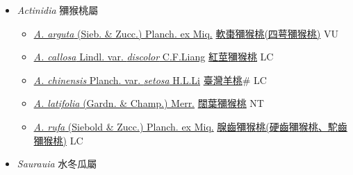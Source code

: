 
  \begin{itemize}
 \item[] \textit{Actinidia} 獼猴桃屬
                    
  \begin{itemize}
        \item[] \href{http://www.theplantlist.org/tpl1.1/search?q=Actinidia+arguta}{\textit{A. arguta} (Sieb. \& Zucc.) Planch. ex Miq.}     \href{\detokenize{http://taibnet.sinica.edu.tw/chi/taibnet_species_list.php?T2=軟棗獼猴桃&T2_new_value=true&fr=y}}{軟棗獼猴桃(四萼獼猴桃)}   VU
        \item[] \href{http://www.theplantlist.org/tpl1.1/search?q=Actinidia+callosa+var.+discolor}{\textit{A. callosa} Lindl. var. \textit{discolor} C.F.Liang}     \href{\detokenize{http://taibnet.sinica.edu.tw/chi/taibnet_species_list.php?T2=紅莖獼猴桃&T2_new_value=true&fr=y}}{紅莖獼猴桃} LC
        \item[] \href{http://www.theplantlist.org/tpl1.1/search?q=Actinidia+chinensis+var.+setosa}{\textit{A. chinensis} Planch. var. \textit{setosa} H.L.Li}   \href{\detokenize{http://taibnet.sinica.edu.tw/chi/taibnet_species_list.php?T2=臺灣羊桃&T2_new_value=true&fr=y}}{臺灣羊桃}\# LC
        \item[] \href{http://www.theplantlist.org/tpl1.1/search?q=Actinidia+latifolia}{\textit{A. latifolia} (Gardn. \& Champ.) Merr.}   \href{\detokenize{http://taibnet.sinica.edu.tw/chi/taibnet_species_list.php?T2=闊葉獼猴桃&T2_new_value=true&fr=y}}{闊葉獼猴桃} NT
        \item[] \href{http://www.theplantlist.org/tpl1.1/search?q=Actinidia+rufa}{\textit{A. rufa} (Siebold \& Zucc.) Planch. ex Miq.}        \href{\detokenize{http://taibnet.sinica.edu.tw/chi/taibnet_species_list.php?T2=腺齒獼猴桃&T2_new_value=true&fr=y}}{腺齒獼猴桃(硬齒獼猴桃、駝齒獼猴桃)}    LC
  \end{itemize}
 \item[] \textit{Saurauia} 水冬瓜屬
                    

\end{itemize}
